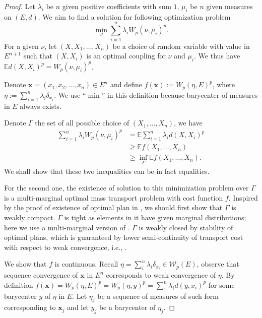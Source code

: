 \begin{proof}
	Let $\lambda_i$ be $n$ given positive coefficients with sum $1$,
	$\mu_i$ be $n$ given measures on $(E,d)$.
	We aim to find a solution for following optimization problem
	\[
		\min_{\nu} \sum_{i=1}^{n}\lambda_i W_p(\nu, \mu_i)^p.
	\]
	For a given $\nu$, let $(X, X_1,\ldots,X_n)$ be a choice of random variable with value in $E^{n+1}$ such that $(X,X_i)$ is an optimal coupling for $\nu$ and $\mu_i$. We thus have $\mathbb{E}d(X,X_i)^p = W_p(\nu, \mu_i)^p$.

	Denote $\boldsymbol{x}=(x_1, x_2, \ldots, x_n) \in E^n$ and define $f(\boldsymbol{x}):= W_p(\eta, E)^p$,
	where $\eta := \sum_{i=1}^{n} \lambda_i \delta_{x_i}$.
	We use ``$\min$'' in this definition because barycenter of measures in $E$ always exists.

	Denote $\Gamma$ the set of all possible choice of $(X_1, \ldots, X_n)$, we have
	\begin{align*}
		\sum_{i=1}^{n}\lambda_i W_p(\nu, \mu_i)^p & = \mathbb{E} \sum_{i=1}^{n}\lambda_i d(X,X_i)^p  \\
		                                          & \geq \mathbb{E} f(X_1, \ldots, X_n)              \\
		                                          & \geq \inf_\Gamma \mathbb{E} f(X_1, \ldots, X_n).
	\end{align*}
	We shall show that these two inequalities can be in fact equalities.

	For the second one, the existence of solution to this minimization problem over $\Gamma$
	is a multi-marginal optimal mass transport problem with cost function $f$.
	Inspired by the proof of existence of optimal plan in ,
	we should first show that $\Gamma$ is weakly compact.
	$\Gamma$ is tight as elements in it have given marginal distributions;
	here we use a multi-marginal version of .
	$\Gamma$ is weakly closed by stability of optimal plans,
	which is guaranteed by lower semi-continuity of transport cost with respect to weak convergence,
	i.e., .

	We show that $f$ is continuous.
	Recall $\eta= \sum_i^{n}\lambda_i \delta_{x_i} \in \mathcal{W}_p(E)$, observe that sequence convergence of $\boldsymbol{x}$ in $E^n$ corresponds to weak convergence of $\eta$.
	By definition $f(\boldsymbol{x}) = W_p(\eta, E)^p=W_p(\eta, y)^p = \sum_{1}^{n} \lambda_i d(y, x_i)^p$
	for some barycenter $y$ of $\eta$ in $E$.
	Let $\eta_j$ be a sequence of measures of such form corresponding to $\boldsymbol{x}_j$ and
	let $y_j$ be a barycenter of $\eta_j$.


\end{proof}
